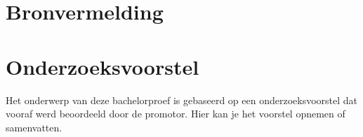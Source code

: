 \documentclass[dutch,dit,thesis]{hogentreport}
\begin{document}
\chapter*{Bronvermelding}

\appendix

\chapter{Onderzoeksvoorstel}
Het onderwerp van deze bachelorproef is gebaseerd op een onderzoeksvoorstel dat vooraf werd beoordeeld door de promotor. Hier kan je het voorstel opnemen of samenvatten.

\backmatter{}
\setlength\bibitemsep{2pt}
\printbibliography[heading=bibintoc]
\end{document}
